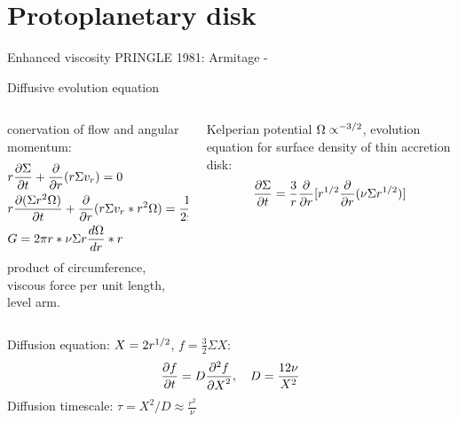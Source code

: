 \section{Protoplanetary disk}

\begin{wordonframe}{Enhanced viscosity}
PRINGLE 1981:
Armitage - 
\end{wordonframe}

\begin{frame}{Diffusive evolution equation}
\begin{columns}[T]\begin{column}{0.5\textwidth}
conervation of flow and angular momentum:
\begin{align*}
&r\PDy{t}{\Sigma}+\PDof{r}(r\Sigma v_r)=0\\
&r\PDy{t}{(\Sigma r^2\Omega)}+\PDof{r}(r\Sigma v_r*r^2\Omega)=\frac{1}{2\pi}\PDy{r}{G}\\
&G=2\pi r*\nu\Sigma r\TDy{r}{\Omega}*r
\end{align*}
product of circumference, viscous force per unit length, level arm.
\end{column}\begin{column}{0.5\textwidth}
Kelperian potential $\Omega\propto\expy{-3/2}$, evolution equation for  surface density of thin accretion disk:
\[\PDy{t}{\Sigma}=\frac{3}{r}\PDof{r}[r\expy{1/2}\PDof{r}(\nu\Sigma r\expy{1/2})]\]
\end{column}\end{columns}
Diffusion equation: $X=2r\expy{1/2}$, $f=\frac{3}{2}\Sigma X$:
\[\PDy{t}{f}=D\PtwoDy{X}{f},\quad D=\frac{12\nu}{X^2}\]
Diffusion timescale: $\tau=X^2/D\approx\frac{r^2}{\nu}$
\end{frame}